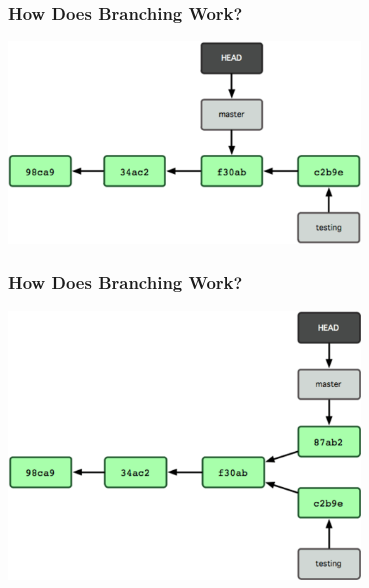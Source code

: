 \begin{frame}
\frametitle{\large How Does Branching Work?}
\begin{center}
\includegraphics[width=0.7\textwidth]{img/branching_images/fig8.png}
\end{center}
\end{frame}

\begin{frame}
\frametitle{\large How Does Branching Work?}
\begin{center}
\includegraphics[width=0.7\textwidth]{img/branching_images/fig9.png}
\end{center}
\end{frame}